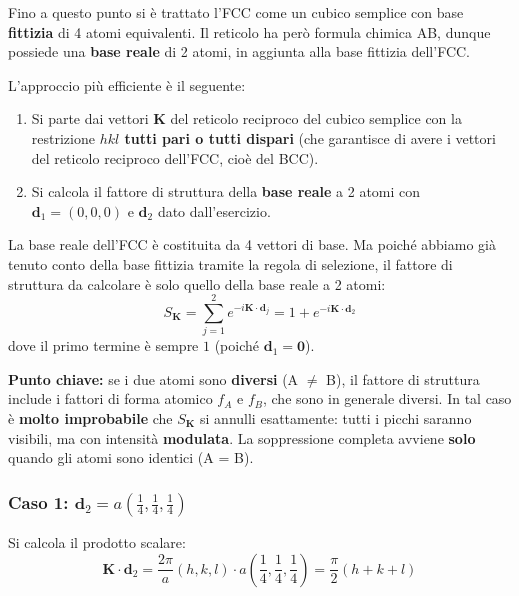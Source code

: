 Fino a questo punto si è trattato l'FCC come un cubico semplice con base \textbf{fittizia} di 4 atomi equivalenti. Il reticolo ha però formula chimica AB, dunque possiede una \textbf{base reale} di 2 atomi, in aggiunta alla base fittizia dell'FCC.

L'approccio più efficiente è il seguente:

\begin{enumerate}
    \item Si parte dai vettori $\mathbf{K}$ del reticolo reciproco del cubico semplice con la restrizione \textbf{$hkl$ tutti pari o tutti dispari} (che garantisce di avere i vettori del reticolo reciproco dell'FCC, cioè del BCC).
    \item Si calcola il fattore di struttura della \textbf{base reale} a 2 atomi con $\mathbf{d}_1 = (0, 0, 0)$ e $\mathbf{d}_2$ dato dall'esercizio.
\end{enumerate}

La base reale dell'FCC è costituita da 4 vettori di base. Ma poiché abbiamo già tenuto conto della base fittizia tramite la regola di selezione, il fattore di struttura da calcolare è solo quello della base reale a 2 atomi:
\begin{equation}
S_{\mathbf{K}} = \sum_{j=1}^{2} e^{-i\mathbf{K}\cdot\mathbf{d}_j} = 1 + e^{-i\mathbf{K}\cdot\mathbf{d}_2}
\end{equation}
dove il primo termine è sempre $1$ (poiché $\mathbf{d}_1 = \mathbf{0}$).

\begin{nota}
\textbf{Punto chiave:} se i due atomi sono \textbf{diversi} (A $\neq$ B), il fattore di struttura include i fattori di forma atomico $f_A$ e $f_B$, che sono in generale diversi. In tal caso è \textbf{molto improbabile} che $S_{\mathbf{K}}$ si annulli esattamente: tutti i picchi saranno visibili, ma con intensità \textbf{modulata}. La soppressione completa avviene \textbf{solo} quando gli atomi sono identici (A = B).
\end{nota}

\subsubsection{Caso 1: $\mathbf{d}_2 = a\left(\frac{1}{4}, \frac{1}{4}, \frac{1}{4}\right)$}

Si calcola il prodotto scalare:
\begin{equation}
\mathbf{K} \cdot \mathbf{d}_2 = \frac{2\pi}{a}(h, k, l) \cdot a\left(\frac{1}{4}, \frac{1}{4}, \frac{1}{4}\right) = \frac{\pi}{2}(h + k + l)
\end{equation}

